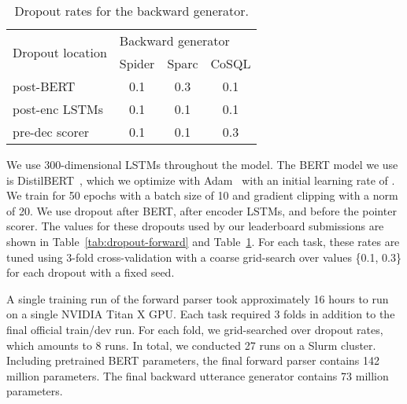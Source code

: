 \documentclass[11pt,a4paper]{article}
\begin{document}
\begin{table}[ht]
\centering
\begin{tabular}{@{}lccc@{}}
\toprule
\multirow{2}{*}{Dropout location} & \multicolumn{3}{l}{Backward generator} \\ \cmidrule(l){2-4} 
                                  & Spider     & Sparc     & CoSQL     \\ \midrule
post-BERT                     & 0.1        & 0.3       & 0.1       \\
post-enc LSTMs                & 0.1        & 0.1       & 0.1       \\
pre-dec scorer                & 0.1        & 0.1       & 0.3       \\ \bottomrule
\end{tabular}
\caption{Dropout rates for the backward generator.}
\label{tab:dropout-backward}
\end{table}


We use 300-dimensional LSTMs throughout the model.
The BERT model we use is DistilBERT~\citep{sanh2019distilbert}, which we optimize with Adam~\citep{Kingma2014AdamAM} with an initial learning rate of .
We train for 50 epochs with a batch size of 10 and gradient clipping with a norm of 20.
We use dropout after BERT, after encoder LSTMs, and before the pointer scorer.
The values for these dropouts used by our leaderboard submissions are shown in Table~\ref{tab:dropout-forward} and Table~\ref{tab:dropout-backward}.
For each task, these rates are tuned using 3-fold cross-validation with a coarse grid-search over values \{0.1, 0.3\} for each dropout with a fixed seed.


A single training run of the forward parser took approximately 16 hours to run on a single NVIDIA Titan X GPU.
Each task required 3 folds in addition to the final official train/dev run.
For each fold, we grid-searched over dropout rates, which amounts to 8 runs.
In total, we conducted 27 runs on a Slurm cluster.
Including pretrained BERT parameters, the final forward parser contains 142 million parameters.
The final backward utterance generator contains 73 million parameters.
\end{document}
